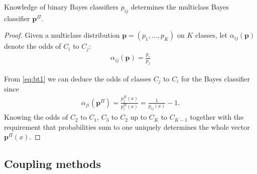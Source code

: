 \begin{prop}
	 \label{prop:binary2multi}
	 Knowledge of binary Bayes classifiers $p_{ij}$ determines the multiclass Bayes classifier $\boldsymbol{p}^\Pi$.
\end{prop}
\begin{proof}
	Given a multiclass distribution $\boldsymbol{p} = (p_1, \ldots,p_K)$ on $K$ classes, let $\alpha_{ij}(\boldsymbol{p})$ denote the odds of $C_i$ to $C_j$:
	\begin{align}
		\alpha_{ij}(\boldsymbol{p}) = \frac{p_i}{p_j} \label{eq:alpha}
	\end{align}
	
	From \eqref{eq:bt1} we can deduce the odds of classes $C_j$ to $C_i$ for the Bayes classifier since
	\begin{align}
	\alpha_{ji}(\boldsymbol{p}^\Pi) = \frac{p_j^\Pi(x)}{p_i^\Pi(x)} = \frac{1}{p_{ij}(x)}- 1.
	\end{align}
	Knowing the odds of $C_2$ to $C_1$, $C_3$ to $C_2$ up to $C_{K}$ to $C_{K-1}$ together with the requirement that probabilities sum to one uniquely determines the whole vector $\boldsymbol{p}^\Pi(x)$.
\end{proof}


\subsection{Coupling methods}

